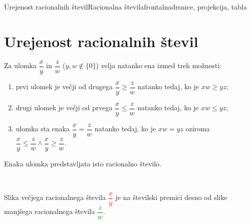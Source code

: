 \begin{priprava}{7}{}{Urejenost racionalnih števil}{Racionalna števila}{frontalna}{drsnice, projekcija, tabla}

    \section{Urejenost racionalnih števil}

            
    
    Za ulomka $\dfrac{x}{y}$ in $\dfrac{z}{w}$ ($y,w\notin\{0\}$) velja natanko ena izmed treh možnosti:
    
    \begin{enumerate}
        \item prvi ulomek je večji od drugega $\dfrac{x}{y}\geq\dfrac{z}{w}$ natanko tedaj, ko je $xw\geq yz$;
        \item drugi ulomek je večji od prvega $\dfrac{x}{y}\leq\dfrac{z}{w}$ natanko tedaj, ko je $xw\leq yz$;
        \item ulomka sta enaka $\dfrac{x}{y}=\dfrac{z}{w}$ natanko tedaj, ko je $xw=yz$ oziroma $\dfrac{x}{y}\leq\dfrac{z}{w} \land \dfrac{x}{y}\geq\dfrac{z}{w}$.
    \end{enumerate}


    Enaka ulomka predstavljata isto racionalno število.

    ~

    Slika večjega racionalnega števila \textcolor{red}{$\dfrac{x}{y}$} je na številski premici desno od slike manjšega racionalnega števila \textcolor{green}{$\dfrac{z}{w}$}.
\begin{figure}[H]
    \centering
\end{figure}
\end{priprava}
